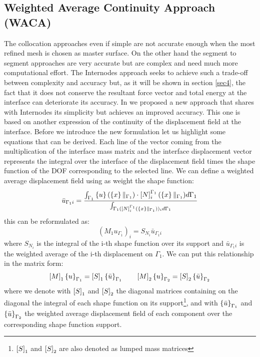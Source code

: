 \subsection{Weighted Average Continuity Approach (WACA)}\label{sssec36}
The collocation approaches even if simple are not accurate enough when the most refined mesh is chosen as master surface. On the other hand the segment to segment approaches are very accurate but are complex and need much more computational effort. The Internodes approach seeks to achieve such a trade-off between complexity and accuracy but, as it will be shown in section \ref{sec4}, the fact that it does not conserve the resultant force vector and total energy at the interface can deteriorate its accuracy. In \cite{coniglio2018weighted} we proposed a new approach that shares with Internodes its simplicity but achieves an improved accuracy.
This one is based on another expression of the continuity of the displacement field at the interface. Before we introduce the new formulation let us highlight some equations that can be derived. Each line of the vector coming from the multiplication of the interface mass matrix and the interface displacement vector represents the integral over the interface of the displacement field times the shape function of the DOF corresponding to the selected line. We can define a weighted average displacement field using as weight the shape function:
\begin{equation}
\label{eq.73a}
\bar{u}_{\Gamma_1i}=\frac{\int_{\Gamma_1}\left\lbrace{u}\right \rbrace(\left\lbrace{x}\right \rbrace\|_{\Gamma_1})\cdot\left[{N}\right]_{i}^{\Gamma_1}(\left\lbrace{x}\right \rbrace\|_{\Gamma_1})d\Gamma_1}{\int_{\Gamma_1(\left[{N}\right]_{i}^{\Gamma_1}(\left\lbrace{x}\right \rbrace\|_{\Gamma_1}))_id\Gamma_1}}
\end{equation}
this can be reformulated as:
\begin{equation}
\label{eq.73}
({M}_{1}{u}_{\Gamma_1})_i=S_{N_i}\bar{u}_{\Gamma_1i}
\end{equation}
where $S_{N_i}$ is the integral of the i-th shape function over its support  and $\bar{u}_{\Gamma_1i}$ is the weighted average of the i-th displacement on $\Gamma_1$. 
We can put this relationship in the matrix form:
\begin{eqnarray}
\label{eq.74}
\left[{M}\right]_{1}\left\lbrace{u}\right \rbrace_{\Gamma_1}=\left[{S}\right]_1\left\lbrace{\bar{u}}\right \rbrace_{\Gamma_1}\qquad
\left[{M}\right]_{2}\left\lbrace{u}\right \rbrace_{\Gamma_2}=\left[{S}\right]_2\left\lbrace{\bar{u}}\right \rbrace_{\Gamma_2}
\end{eqnarray}
where we denote with $\left[{S}\right]_1$ and $\left[{S}\right]_2$ the diagonal matrices containing on the diagonal the integral of each shape function on its support\footnote{$\left[{S}\right]_1$ and $\left[{S}\right]_2$ are also denoted as lumped mass matrices}, and with $\left\lbrace{\bar{u}}\right \rbrace_{\Gamma_1}$ and $\left\lbrace{\bar{u}}\right \rbrace_{\Gamma_2}$ the weighted average displacement field of each component over the corresponding shape function support.
